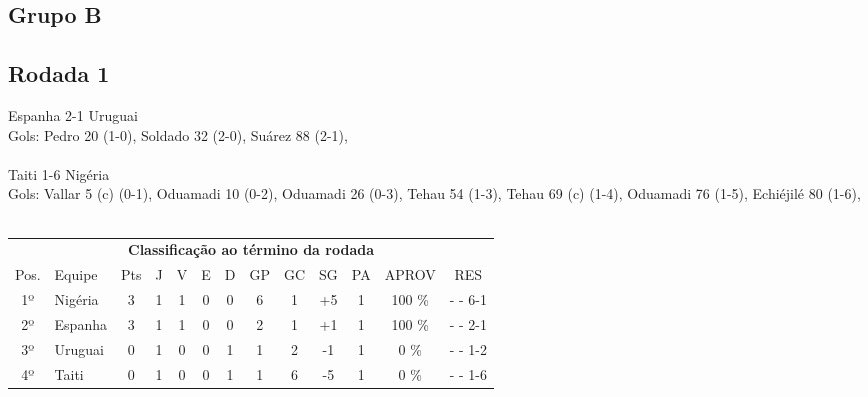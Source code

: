 \documentclass{article}
\begin{document}
\subsection*{Grupo B}
\subsection*{Rodada 1}
Espanha 2-1 Uruguai\\
Gols: Pedro  20 (1-0), Soldado  32 (2-0), Suárez  88 (2-1), \\
\\
Taiti 1-6 Nigéria\\
Gols: Vallar  5 (c) (0-1), Oduamadi  10 (0-2), Oduamadi  26 (0-3), Tehau  54 (1-3), Tehau  69 (c) (1-4), Oduamadi  76 (1-5), Echiéjilé  80 (1-6), \\
\\
\begin{center}
\begin{tabular}{| c | l | c | c | c | c | c | c | c | c | c | c | c |}
\multicolumn{13}{c}{\textbf{Classificação ao término da rodada}}\\
Pos.&Equipe&Pts&J&V&E&D&GP&GC&SG&PA&APROV&RES\\
1º&Nigéria             &3&1	&1&0&0	&6&1&+5	&1&100 \%	& -  - 6-1 \\
2º&Espanha             &3&1	&1&0&0	&2&1&+1	&1&100 \%	& -  - 2-1 \\
3º&Uruguai             &0&1	&0&0&1	&1&2&-1	&1&  0 \%	& -  - 1-2 \\
4º&Taiti               &0&1	&0&0&1	&1&6&-5	&1&  0 \%	& -  - 1-6 \\
\end{tabular}
\end{center}
\end{document}
